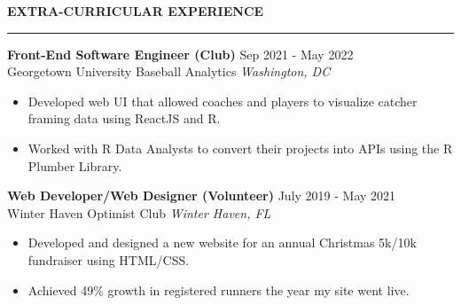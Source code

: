 \documentclass[10pt,letterpaper]{article}
\begin{document}


\medskip
\MakeUppercase{{\bf Extra-Curricular Experience}}
\medskip
\hrule
\begin{list}{}{\setlength{\leftmargin}{0em}}
    \item
          \textbf{Front-End Software Engineer (Club)} \hfill Sep 2021 - May 2022\\
          Georgetown University Baseball Analytics \hfill \textit{Washington, DC}
          \begin{itemize}
              \itemsep -3pt {}
              \item Developed web UI that allowed coaches and players to visualize catcher framing data using ReactJS and R. \
              \item Worked with R Data Analysts to convert their projects into APIs using the R Plumber Library.
          \end{itemize}

    \item
          \textbf{Web Developer/Web Designer (Volunteer)} \hfill July 2019 - May 2021\\
          Winter Haven Optimist Club \hfill \textit{Winter Haven, FL}
          \begin{itemize}
              \itemsep -3pt {}
              \item Developed and designed a new website for an annual Christmas 5k/10k fundraiser using HTML/CSS.
              \item Achieved 49\% growth in registered runners the year my site went live.
          \end{itemize}
\end{list}

\end{document}
